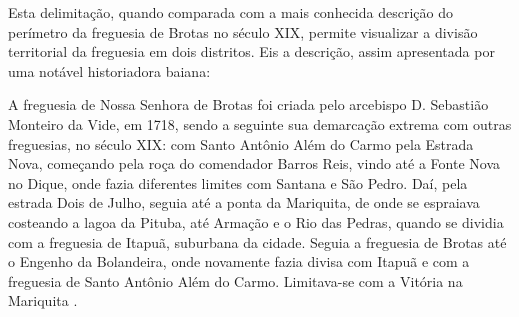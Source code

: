Esta delimitação, quando comparada com a mais conhecida descrição do perímetro da freguesia de Brotas no século XIX, permite visualizar a divisão territorial da freguesia em dois distritos. Eis a descrição, assim apresentada por uma notável historiadora baiana:

\begin{citacao}\label{nascimentodescreve}
A freguesia de Nossa Senhora de Brotas foi criada pelo arcebispo D. Sebastião Monteiro da Vide, em 1718, sendo a seguinte sua demarcação extrema com outras freguesias, no século XIX: com Santo Antônio Além do Carmo pela Estrada Nova, começando pela roça do comendador Barros Reis, vindo até a Fonte Nova no Dique, onde fazia diferentes limites com Santana e São Pedro. Daí, pela estrada Dois de Julho, seguia até a ponta da Mariquita, de onde se espraiava costeando a lagoa da Pituba, até Armação e o Rio das Pedras, quando se dividia com a freguesia de Itapuã, suburbana da cidade. Seguia a freguesia de Brotas até o Engenho da Bolandeira, onde novamente fazia divisa com Itapuã e com a freguesia de Santo Antônio Além do Carmo. Limitava-se com a Vitória na Mariquita \cite[p.~58]{NASCIMENTO2007}.
\end{citacao}

